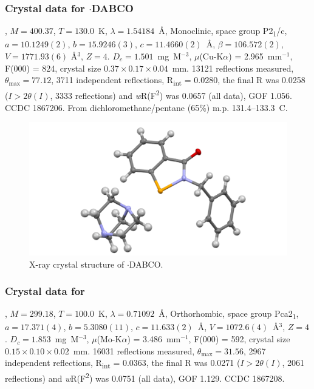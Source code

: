 \begin{refsection}
    \subsubsection{Crystal data for \texorpdfstring{$ \cdot $DABCO}{C20H23N3OSe}}
    , $M=400.37$, $T=130.0$~K, $\lambda=1.54184$~\AA, Monoclinic, space group P2\textsubscript{1}/c, $a = 10.1249(2)$, $b = 15.9246(3)$, $c = 11.4660(2)$~\AA, $\beta = 106.572(2)$\degree, $V = 1771.93(6)$ \AA$^{3}$, $Z = 4$.
    $D_{c} = 1.501$~mg~M$^{-3}$, $\mu$(Cu-K$\alpha$) = 2.965~mm$^{-1}$, F(000) = 824, crystal size $0.37 \times 0.17 \times 0.04$~mm.
    13121 reflections measured, $\theta_{\max} = 77.12$\degree, 3711 independent reflections, R\textsubscript{int} = 0.0280, the final R was 0.0258 ($I > 2\theta(I)$, 3333 reflections) and \textit{w}R(F\textsuperscript{2}) was 0.0657 (all data), GOF 1.056.
    CCDC 1867206.
    From dichloromethane/pentane (65\%) m.p. 131.4--133.3~\degree{}C.
    
    \begin{figure}
      \includegraphics[width=0.6\linewidth]{Figures/ebs-bn-dabco-xtal.pdf}
      \caption{X-ray crystal structure of \texorpdfstring{$ \cdot $DABCO}{C20H23N3OSe}.}
    \end{figure}
    
    \subsubsection{Crystal data for \texorpdfstring{}{C14H8N2OSe}}
    , $M=299.18$, $T=100.0$~K, $\lambda=0.71092$~\AA, Orthorhombic, space group Pca2\textsubscript{1}, $a = 17.371(4)$, $b = 5.3080(11)$, $c = 11.633(2)$~\AA, $V = 1072.6(4)$~\AA$^{3}$, $Z = 4$.
    $D_{c}= 1.853$~mg~M$^{-3}$, $\mu$(Mo-K$\alpha$) = 3.486~mm$^{-1}$, F(000) = 592, crystal size $0.15 \times 0.10 \times 0.02$~mm.
    16031 reflections measured, $\theta_{\max}=31.56$\degree, 2967 independent reflections, R\textsubscript{int} = 0.0363, the final R was 0.0271 ($I > 2\theta(I)$, 2061 reflections) and \textit{w}R(F\textsuperscript{2}) was 0.0751 (all data), GOF 1.129.
    CCDC 1867208.
    

\end{refsection}
